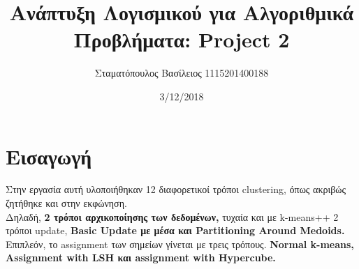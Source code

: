 \documentclass{article}
\begin{document}
\title{\textgreek{Ανάπτυξη Λογισμικού για Αλγοριθμικά Προβλήματα:} Project 2}
\author{\textgreek{Σταματόπουλος Βασίλειος } 1115201400188}
\date{3/12/2018}
\maketitle
\section{ \textgreek{Εισαγωγή}}
\textgreek{Στην εργασία αυτή υλοποιήθηκαν 12 διαφορετικοί τρόποι} clustering,\textgreek{ όπως ακριβώς ζητήθηκε και στην εκφώνηση. \\Δηλαδή, \textbf{2 τρόποι αρχικοποίησης των δεδομένων,} τυχαία και με} k-means++ \textgreek{ 2 τρόποι }update,\textbf{ Basic Update \textgreek{με μέσα και} Partitioning Around Medoids. }\textgreek{ Επιπλεόν, το }assignment \textgreek{των σημείων γίνεται με τρεις τρόπους.} \textbf{Normal k-means, Assignment with LSH \textgreek{και} assignment with Hypercube.}
\end{document}
